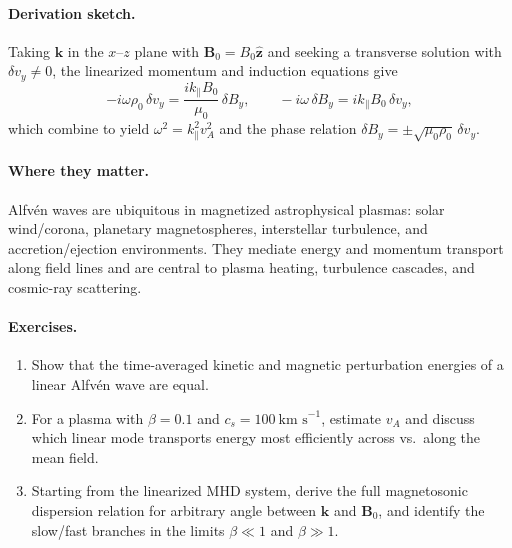 \paragraph{Derivation sketch.}
Taking $\mathbf{k}$ in the $x$–$z$ plane with $\mathbf{B}_0=B_0\hat{\mathbf{z}}$ and seeking a transverse solution with $\delta v_y\neq 0$, the linearized momentum and induction equations give
\[
-i\omega \rho_0\,\delta v_y = \frac{i k_\parallel B_0}{\mu_0}\,\delta B_y,\qquad
-i\omega\,\delta B_y = i k_\parallel B_0\,\delta v_y,
\]
which combine to yield $\omega^2 = k_\parallel^2 v_A^2$ and the phase relation 
$\delta B_y = \pm \sqrt{\mu_0\rho_0}\,\delta v_y$.

\paragraph{Where they matter.}
Alfv\'en waves are ubiquitous in magnetized astrophysical plasmas: solar wind/corona, planetary magnetospheres, interstellar turbulence, and accretion/ejection environments. They mediate energy and momentum transport along field lines and are central to plasma heating, turbulence cascades, and cosmic-ray scattering.

\paragraph{Exercises.}
\begin{enumerate}
\item Show that the time-averaged kinetic and magnetic perturbation energies of a linear Alfv\'en wave are equal.
\item For a plasma with $\beta=0.1$ and $c_s=100~\text{km s}^{-1}$, estimate $v_A$ and discuss which linear mode transports energy most efficiently across vs.\ along the mean field.
\item Starting from the linearized MHD system, derive the full magnetosonic dispersion relation for arbitrary angle between $\mathbf{k}$ and $\mathbf{B}_0$, and identify the slow/fast branches in the limits $\beta\ll1$ and $\beta\gg1$.
\end{enumerate}




%
%
%
